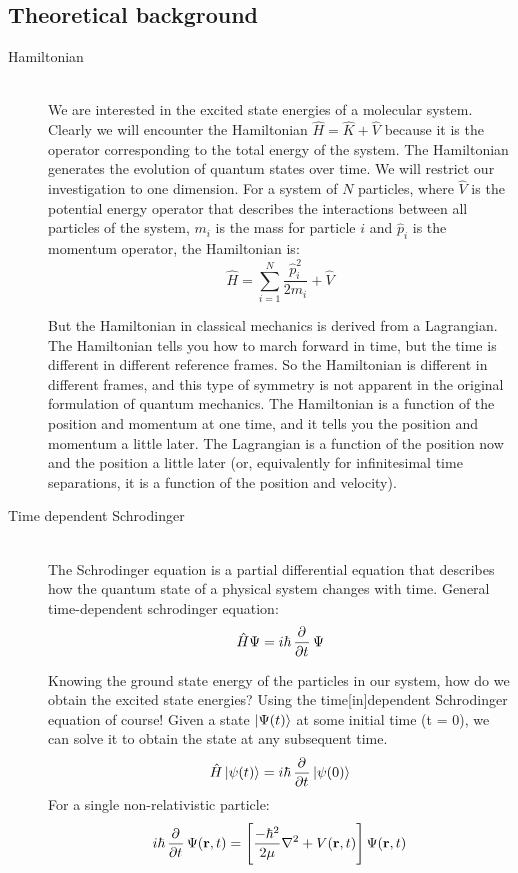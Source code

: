 \documentclass[12pt,letterpaper,oneside,final,titlepage]{article}               %
\numberwithin{equation}{section} %
\renewcommand{\vec}[1]{\mathbf{#1}}
\begin{document}
\subsection{Theoretical background}
\begin{description}
    \item[Hamiltonian] \hfill \\
    We are interested in the excited state energies of a molecular system. 
    Clearly we will encounter the Hamiltonian $\hat{H} = \hat{K} + \hat{V}$ because it is the operator corresponding to the total energy of the system.
    The Hamiltonian generates the evolution of quantum states over time. 
    We will restrict our investigation to one dimension. 
    For a system of $N$ particles, where $\hat{V}$ is the potential energy operator that describes the interactions between 
    all particles of the system, $m_{i}$ is the mass for particle $i$ and $\hat{p}_{i}$ is the momentum operator, the Hamiltonian is:
    \begin{equation}
        \hat{H} = \sum_{i=1}^{N}\frac{\hat{p}_{i}^2}{2m_{i}} + \hat{V}
    \end{equation}

    But the Hamiltonian in classical mechanics is derived from a Lagrangian. 
    The Hamiltonian tells you how to march forward in time, but the time is different in different reference frames. 
    So the Hamiltonian is different in different frames, and this type of symmetry is not apparent in the original formulation of quantum mechanics.
    The Hamiltonian is a function of the position and momentum at one time, and it tells you the position and momentum a little later. 
    The Lagrangian is a function of the position now and the position a little later (or, equivalently for infinitesimal time separations, it is a function of the position and velocity). 



    \item[Time dependent Schrodinger] \hfill \\
    The Schrodinger equation is a partial differential equation that describes how the quantum state of a physical system changes with time. General time-dependent schrodinger equation:
    \begin{equation}
        \hat{H}\Psi = i\hbar\dpd{}{t}\Psi
    \end{equation}


    Knowing the ground state energy of the particles in our system, how do we obtain the excited state energies? 
    Using the time[in]dependent Schrodinger equation of course! 
    Given a state $\ket{\Psi(t)}$ at some initial time (t = 0), we can solve it to obtain the state at any subsequent time.
    \begin{equation}
        \hat{H}\ket{\psi(t)} = i\hbar\dpd{}{t}\ket{\psi(0)}  
    \end{equation}
    For a single non-relativistic particle:
    \begin{equation}
        i\hbar\dpd{}{t}\Psi(\vec{r},t) = \left[\frac{-\hbar^{2}}{2\mu}\nabla^{2} + V(\vec{r},t)\right]\Psi(\vec{r},t)
    \end{equation}


\end{description}
\end{document}
